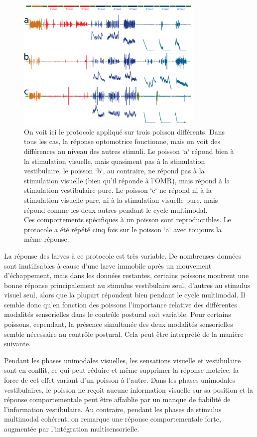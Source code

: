 \begin{figure}
\centering
\includegraphics[width=0.8\textwidth]{./files/raw_data.svg.png}
\caption{
On voit ici le protocole appliqué sur trois poisson différents. Dans tous les cas, la réponse optomotrice fonctionne, mais on voit des différences au niveau des autres stimuli. Le poisson `a` répond bien à la stimulation visuelle, mais quasiment pas à la stimulation vestibulaire, le poisson `b`, au contraire, ne répond pas à la stimulation visuelle (bien qu'il réponde à l'OMR), mais répond à la stimulation vestibulaire pure. Le poisson `c` ne répond ni à la stimulation visuelle pure, ni à la stimulation visuelle pure, mais répond comme les deux autres pendant le cycle multimodal.
\\
Ces comportements spécifiques à un poisson sont reproductibles. Le protocole a été répété cinq fois sur le poisson `a` avec toujours la même réponse.
}
\end{figure}

La réponse des larves à ce protocole est très variable. De nombreuses données sont inutilisables à cause d'une larve immobile après un mouvement d'échappement, mais dans les données restantes, certains poissons montrent une bonne réponse principalement au stimulus vestibulaire seul, d'autres au stimulus visuel seul, alors que la plupart répondent bien pendant le cycle multimodal. Il semble donc qu'en fonction des poissons l'importance relative des différentes modalités sensorielles dans le contrôle postural soit variable. Pour certains poissons, cependant, la présence simultanée des deux modalités sensorielles semble nécessaire au contrôle postural. Cela peut être interprété de la manière suivante.

Pendant les phases unimodales visuelles, les sensations visuelle et vestibulaire sont en conflit, ce qui peut réduire et même supprimer la réponse motrice, la force de cet effet variant d'un poisson à l'autre. Dans les phases unimodales vestibulaires, le poisson ne reçoit aucune information visuelle sur sa position et la réponse comportementale peut être affaiblie par un manque de fiabilité de l'information vestibulaire. Au contraire, pendant les phases de stimulus multimodal cohérent, on remarque une réponse comportementale forte, augmentée par l'intégration multisensorielle.

